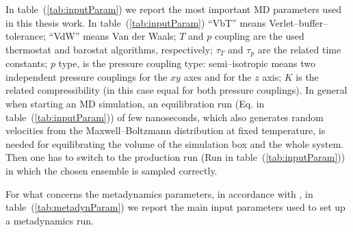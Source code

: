 In table~(\ref{tab:inputParam}) we report the most important \ac{MD} parameters used in this thesis work. In 
table~(\ref{tab:inputParam}) ``VbT'' means Verlet--buffer--tolerance; ``VdW'' means Van der Waals; $T$ and $p$ 
coupling are the used thermostat and barostat algorithms, respectively; $\tau_T$ and $\tau_p$ are the related time 
constants; $p$ type, is the pressure coupling type: semi--isotropic means two independent pressure couplings for 
the $xy$ axes and for the $z$ axis; $K$ is the related compressibility (in this case equal for both pressure 
couplings). In general when starting an \ac{MD} simulation, an equilibration run (Eq. in 
table~(\ref{tab:inputParam})) of few nanoseconds, which also generates random velocities from the 
Maxwell–Boltzmann distribution at fixed temperature, is needed for equilibrating the volume of the simulation box 
and the whole system. Then one has to switch to the production run (Run in table~(\ref{tab:inputParam})) in which 
the chosen ensemble is sampled correctly. 

For what concerns the metadynamics parameters, in accordance with \cite{ourPaper}, in 
table~(\ref{tab:metadynParam}) we report the main input parameters used to set up a metadynamics run.

